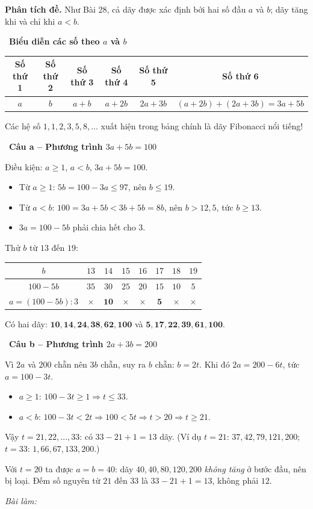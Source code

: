 \documentclass[11pt]{article}
\newif\ifsol \solfalse
\newcommand{\StuProb}[2]{\begin{probboxS}{#1}{#2}\StuProbBody\end{probboxS}}
\newcommand{\probsol}[1]{%
  \begin{lrbox}{\solmeasure}\begin{minipage}{\dimexpr\linewidth-24pt\relax}#1\end{minipage}\end{lrbox}%
  \ifsol
    \begin{solbox}#1\end{solbox}%
  \else
    \setlength{\solht}{\dimexpr\ht\solmeasure+\dp\solmeasure+0.85cm\relax}%
    \ifdim\solht<1.35cm\setlength{\solht}{1.35cm}\fi
    \ifdim\solht>\StudentMaxWork\setlength{\solht}{\StudentMaxWork}\fi
    \par\noindent\begin{minipage}{\linewidth}%
    \expandafter\StuProb\StuProbArgs
    \begin{tcolorbox}[colback=white,colframe=Line,boxrule=0.8pt,arc=5pt,
      left=8pt,right=8pt,top=4pt,bottom=4pt,height=\solht]{\footnotesize\color{Slate}\itshape\WorkWord}\end{tcolorbox}%
    \end{minipage}\par\medskip
  \fi}
\newlength{\StudentMaxWork}\setlength{\StudentMaxWork}{4.5cm}
\newcommand{\step}[2]{\par\smallskip\noindent{\bfseries\color{tmBlue!85!black}\StepWord~#1.}\ {\bfseries #2}\par\nopagebreak}
\def\WorkWord{Bài làm:}
\def\StepWord{Bước}
\begin{document}
\probsol{
\textbf{Phân tích đề.} Như Bài 28, cả dãy được xác định bởi hai số đầu $a$ và $b$; dãy tăng khi và chỉ khi $a<b$.

\step{1}{Biểu diễn các số theo $a$ và $b$}
\begin{center}\small
\begin{tabular}{|c|c|c|c|c|c|}
\hline
\rowcolor{tmBlue!10}Số thứ 1 & Số thứ 2 & Số thứ 3 & Số thứ 4 & Số thứ 5 & Số thứ 6\\ \hline
$a$ & $b$ & $a+b$ & $a+2b$ & $2a+3b$ & $(a+2b)+(2a+3b)=3a+5b$\\ \hline
\end{tabular}
\end{center}
\begin{tipbox}Các hệ số $1,1,2,3,5,8,\dots$ xuất hiện trong bảng chính là dãy Fibonacci nổi tiếng!\end{tipbox}

\step{2}{Câu a -- Phương trình $3a+5b=100$}
Điều kiện: $a\ge 1$, $a<b$, $3a+5b=100$.
\begin{itemize}[leftmargin=1.3em,itemsep=1pt]
\item Từ $a\ge 1$: $5b=100-3a\le 97$, nên $b\le 19$.
\item Từ $a<b$: $100=3a+5b<3b+5b=8b$, nên $b>12{,}5$, tức $b\ge 13$.
\item $3a=100-5b$ phải chia hết cho $3$.
\end{itemize}
Thử $b$ từ $13$ đến $19$:
\begin{center}\small
\begin{tabular}{|c|c|c|c|c|c|c|c|}
\hline
\rowcolor{tmBlue!10}$b$ & $13$ & $14$ & $15$ & $16$ & $17$ & $18$ & $19$\\ \hline
$100-5b$ & $35$ & $30$ & $25$ & $20$ & $15$ & $10$ & $5$\\ \hline
$a=(100-5b):3$ & $\times$ & $\mathbf{10}$ & $\times$ & $\times$ & $\mathbf{5}$ & $\times$ & $\times$\\ \hline
\end{tabular}
\end{center}
Có hai dãy: $\mathbf{10, 14, 24, 38, 62, 100}$ và $\mathbf{5, 17, 22, 39, 61, 100}$.

\step{3}{Câu b -- Phương trình $2a+3b=200$}
Vì $2a$ và $200$ chẵn nên $3b$ chẵn, suy ra $b$ chẵn: $b=2t$. Khi đó $2a=200-6t$, tức $a=100-3t$.
\begin{itemize}[leftmargin=1.3em,itemsep=1pt]
\item $a\ge 1$: $100-3t\ge 1 \Rightarrow t\le 33$.
\item $a<b$: $100-3t<2t \Rightarrow 100<5t \Rightarrow t>20 \Rightarrow t\ge 21$.
\end{itemize}
Vậy $t=21,22,\dots,33$: có $33-21+1=13$ dãy. (Ví dụ $t=21$: $37, 42, 79, 121, 200$; $t=33$: $1, 66, 67, 133, 200$.)
\begin{warnbox}Với $t=20$ ta được $a=b=40$: dãy $40,40,80,120,200$ \emph{không tăng} ở bước đầu, nên bị loại. Đếm số nguyên từ $21$ đến $33$ là $33-21+1=13$, không phải $12$.\end{warnbox}

}
\end{document}
